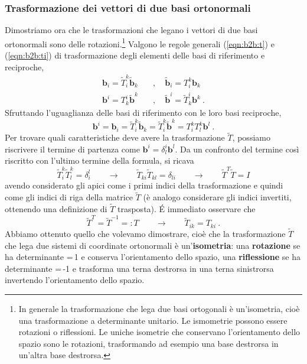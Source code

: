 \subsubsection{Trasformazione dei vettori di due basi ortonormali}
Dimostriamo ora che le trasformazioni che legano i vettori di due basi ortonormali sono delle rotazioni.\footnote{In generale la trasformazione che lega due basi ortogonali è un'isometria, cioè una trasformazione a determinante unitario. Le ismometrie possono essere rotazioni o riflessioni. Le uniche isometrie che conservano l'orientamento dello spazio sono le rotazioni, trasformando ad esempio una base destrorsa in un'altra base destrorsa.}
 Valgono le regole generali (\ref{eqn:b2b:t}) e (\ref{eqn:b2b:ti}) di trasformazione degli elementi delle basi di riferimento e reciproche,
 \begin{equation}
 \begin{aligned}
     \bm{b}_i  = \tilde{T}^k_i \tilde{\bm{b}}_k \quad & ,  \quad \tilde{\bm{b}}_i  =         T^k_i  \bm{b}_k \\
     \bm{b}^i  =         T^i_k \tilde{\bm{b}}^k \quad & ,  \quad \tilde{\bm{b}}^i  = \tilde{T}^i_k \bm{b}^k \ .
 \end{aligned}
 \end{equation}
%
Sfruttando l'uguaglianza delle basi di riferimento con le loro basi reciproche,
 \begin{equation}
     \bm{b}^i = \bm{b}_i = \tilde{T}^k_i \tilde{\bm{b}}_k = \tilde{T}^k_i \tilde{\bm{b}}^k = T^k_i T^k_l \bm{b}^l \ .
 \end{equation}
  Per trovare quali caratteristiche deve avere la trasformazione $\tilde{T}$, possiamo riscrivere il termine di partenza come $\bm{b}^i = \delta_l^i \bm{b}^l$. Da un confronto del termine così riscritto con l'ultimo termine della formula, si ricava
  \begin{equation}
      \tilde{T}^k_i \tilde{T}^k_l  = \delta_i^l \qquad \rightarrow \qquad
      \tilde{T}_{ki} \tilde{T}_{kl}  = \delta_{li} \qquad \rightarrow \qquad
      \tilde{T}^T \tilde{T} = I
  \end{equation}
  avendo considerato gli apici come i primi indici della trasformazione e quindi come gli indici di riga della matrice $\tilde{T}$ (è analogo considerare gli indici invertiti, ottenendo una definizione di $\tilde{T}$ trasposta). \'E immediato osservare che 
\begin{equation}
  \tilde{T}^T = \tilde{T}^{-1} =: T \qquad \rightarrow \qquad
  \tilde{T}_{ik} = T_{ki} \ .
\end{equation}
  Abbiamo ottenuto quello che volevamo dimostrare, cioè che la trasformazione $\tilde{T}$ che lega due sistemi di coordinate ortonormali è un'\textbf{isometria}: una \textbf{rotazione} se ha determinante =\,1 e conserva l'orientamento dello spazio, una \textbf{riflessione} se ha determinante =\,-1 e trasforma una terna destrorsa in una terna sinistrorsa invertendo l'orientamento dello spazio.



